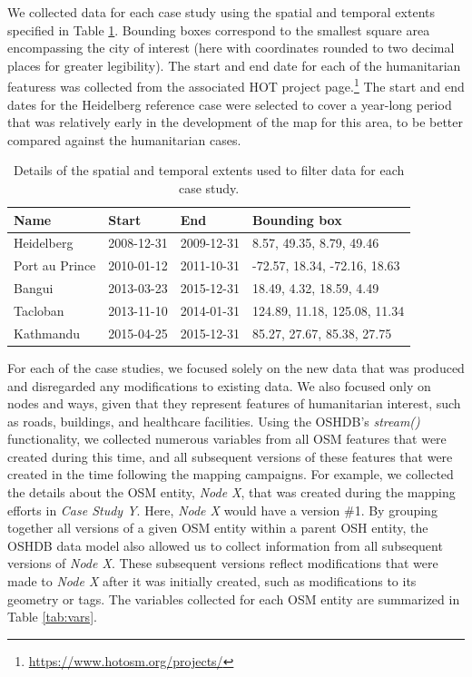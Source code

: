 We collected data for each case study using the spatial and temporal extents specified in Table \ref{tab:cases}. Bounding boxes correspond to the smallest square area encompassing the city of interest (here with coordinates rounded to two decimal places for greater legibility). The start and end date for each of the humanitarian featuress was collected from the associated HOT project page.\footnote{\url{https://www.hotosm.org/projects/}} The start and end dates for the Heidelberg reference case were selected to cover a year-long period that was relatively early in the development of the map for this area, to be better compared against the humanitarian cases. 

\begin{table}
\centering
\caption{Details of the spatial and temporal extents used to filter data for each case study.}
\label{tab:cases}
\begin{tabular}{llll}
\toprule
Name                     & Start      & End        & Bounding box                 \\
\midrule
Heidelberg               & 2008-12-31 & 2009-12-31 & 8.57, 49.35, 8.79, 49.46     \\
Port au Prince         & 2010-01-12 & 2011-10-31 & -72.57, 18.34, -72.16, 18.63 \\
Bangui & 2013-03-23 & 2015-12-31 & 18.49, 4.32, 18.59, 4.49     \\
Tacloban           & 2013-11-10 & 2014-01-31 & 124.89, 11.18, 125.08, 11.34 \\
Kathmandu         & 2015-04-25 & 2015-12-31 & 85.27, 27.67, 85.38, 27.75  \\
\bottomrule
\end{tabular}
\end{table}

For each of the case studies, we focused solely on the new data that was produced and disregarded any modifications to existing data. We also focused only on nodes and ways, given that they represent features of humanitarian interest, such as roads, buildings, and healthcare facilities. Using the OSHDB's \textit{stream()} functionality, we collected numerous variables from all OSM features that were created during this time, and all subsequent versions of these features that were created in the time following the mapping campaigns. For example, we collected the details about the OSM entity, \textit{Node X}, that was created during the mapping efforts in \textit{Case Study Y}. Here, \textit{Node X} would have a version \#1. By grouping together all versions of a given OSM entity within a parent OSH entity, the OSHDB data model also allowed us to collect information from all subsequent versions of \textit{Node X}. These subsequent versions reflect modifications that were made to \textit{Node X} after it was initially created, such as modifications to its geometry or tags. The variables collected for each OSM entity are summarized in Table \ref{tab:vars}. 

